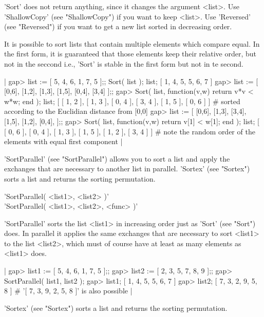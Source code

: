 'Sort'  does not return anything, since it changes the argument <list>. Use
'ShallowCopy'   (see  "ShallowCopy")  if  you  want  to  keep  <list>.  Use
'Reversed'  (see  "Reversed")  if  you  want  to  get  a new list sorted in
decreasing order.

It  is possible to sort lists  that contain multiple elements which compare
equal.  In the first form, it is  guaranteed that those elements keep their
relative  order, but not in the seccond i.e., 'Sort' is stable in the first
form but not in te second.

|    gap> list := [ 5, 4, 6, 1, 7, 5 ];;  Sort( list );  list;
    [ 1, 4, 5, 5, 6, 7 ]
    gap> list := [ [0,6], [1,2], [1,3], [1,5], [0,4], [3,4] ];;
    gap> Sort( list, function(v,w) return v*v < w*w; end ); list;
    [ [ 1, 2 ], [ 1, 3 ], [ 0, 4 ], [ 3, 4 ], [ 1, 5 ], [ 0, 6 ] ]
    #  sorted according to the Euclidian distance from [0,0]
    gap> list := [ [0,6], [1,3], [3,4], [1,5], [1,2], [0,4], ];;
    gap> Sort( list, function(v,w) return v[1] < w[1]; end ); list;
    [ [ 0, 6 ], [ 0, 4 ], [ 1, 3 ], [ 1, 5 ], [ 1, 2 ], [ 3, 4 ] ]
    # note the random order of the elements with equal first component |

'SortParallel'  (see "SortParallel") allows you to  sort a list and apply
the exchanges  that are necessary to  another list in parallel.  'Sortex'
(see "Sortex") sorts a list and returns the sorting permutation.


'SortParallel( <list1>, <list2> )' \\
'SortParallel( <list1>, <list2>, <func> )'

'SortParallel' sorts the list <list1>  in increasing order just as 'Sort'
(see "Sort") does.  In  parallel it applies  the same exchanges  that are
necessary to sort <list1> to the list <list2>, which must of  course have
at least as many elements as <list1> does.

|    gap> list1 := [ 5, 4, 6, 1, 7, 5 ];;
    gap> list2 := [ 2, 3, 5, 7, 8, 9 ];;
    gap> SortParallel( list1, list2 );
    gap> list1;
    [ 1, 4, 5, 5, 6, 7 ]
    gap> list2;
    [ 7, 3, 2, 9, 5, 8 ]    # '[ 7, 3, 9, 2, 5, 8 ]' is also possible |

'Sortex' (see "Sortex") sorts a list and returns the sorting permutation.

%

